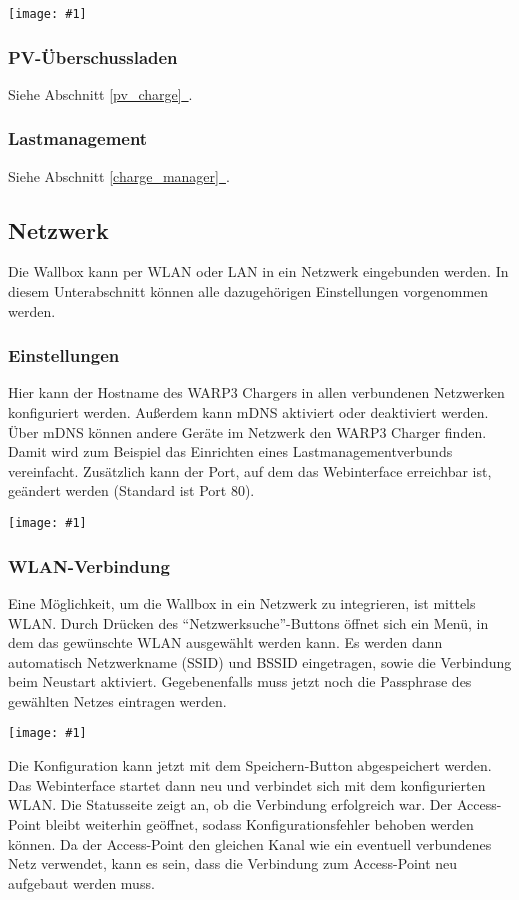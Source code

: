 \documentclass[a4paper,10pt]{article}
\newcommand{\gfx}[1]{\texttt{[image: \#1]}}
\newcommand*{\fullref}[1]{Abschnitt \hyperref[{#1}]{\ref*{#1}~\nameref*{#1}}}
\begin{document}
\begin{multicols*}{2}
	\gfx{./img_warp3/resized/web_charge_manager_chargers}

    \subsubsection{PV-Überschussladen}
    Siehe \fullref{pv_charge}.

    \subsubsection{Lastmanagement}
    Siehe \fullref{charge_manager}.

    \subsection{Netzwerk}\label{network}
    Die Wallbox kann per WLAN oder LAN in ein Netzwerk eingebunden werden.
    In diesem Unterabschnitt können alle dazugehörigen Einstellungen vorgenommen werden.

    \subsubsection{Einstellungen}
    Hier kann der Hostname des WARP3 Chargers in allen verbundenen Netzwerken konfiguriert werden. Außerdem kann mDNS aktiviert oder deaktiviert werden.
    Über mDNS können andere Geräte im Netzwerk den WARP3 Charger finden. Damit
    wird zum Beispiel das Einrichten eines Lastmanagementverbunds vereinfacht.
    Zusätzlich kann der Port, auf dem das Webinterface erreichbar ist, geändert werden (Standard ist
    Port 80).

    \gfx{./img_warp3/resized/web_network}


    \subsubsection{WLAN-Verbindung}
    Eine Möglichkeit, um die Wallbox in ein Netzwerk zu integrieren, ist mittels WLAN.
    Durch Drücken des \enquote{Netzwerksuche}-Buttons öffnet sich ein Menü, in dem das gewünschte WLAN ausgewählt werden kann.
    Es werden dann automatisch Netzwerkname (SSID) und BSSID eingetragen, sowie die Verbindung beim Neustart aktiviert.
    Gegebenenfalls muss jetzt noch die Passphrase des gewählten Netzes eintragen
	werden.

    \gfx{./img_warp3/resized/web_wifi_sta}

    Die Konfiguration kann jetzt mit dem Speichern-Button abgespeichert werden.
    Das Webinterface startet dann neu und verbindet sich mit dem konfigurierten WLAN. Die Statusseite zeigt
    an, ob die Verbindung erfolgreich war. Der Access-Point bleibt weiterhin
    geöffnet, sodass Konfigurationsfehler behoben werden können.
    Da der Access-Point den gleichen Kanal wie ein eventuell verbundenes Netz verwendet,
    kann es sein, dass die Verbindung zum Access-Point neu aufgebaut werden muss.


\end{multicols*}
\end{document}

